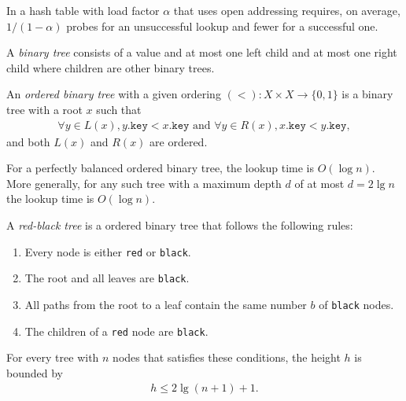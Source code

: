 \documentclass{article}
\begin{document}
\begin{proposition}
	In a hash table with load factor $\alpha$ that uses open addressing requires, on average, $1/(1-\alpha)$
	probes for an unsuccessful lookup and fewer for a successful one.
\end{proposition}
\begin{definition}
	A \emph{binary tree} consists of a value and at most one left child and at most one right child where
	children are other binary trees.
\end{definition}
\begin{definition}
	An \emph{ordered binary tree} with a given ordering $(<) : X\times X \to \{0, 1\}$ is a binary tree
	with a root $x$ such that
	\begin{align*}
		\forall y \in L(x), y.\texttt{key} < x.\texttt{key}
		\text{ and } \forall y \in R(x), x.\texttt{key} < y.\texttt{key},
	\end{align*}
	and both $L(x)$ and $R(x)$ are ordered.
\end{definition}

\begin{proposition}
	For a perfectly balanced ordered binary tree, the lookup time is $O(\log n)$.\\
	More generally, for any such tree with a maximum depth $d$ of at most $d=2 \lg n$ the
	lookup time is $O(\log n)$.
\end{proposition}

\begin{theorem}[L9]
	A \emph{red-black tree} is a ordered binary tree that follows the
	following rules:
	\begin{enumerate}
		\item Every node is either \texttt{red} or \texttt{black}.
		\item The root and all leaves are \texttt{black}.
		\item All paths from the root to a leaf contain the same number $b$ of \texttt{black} nodes.
		\item The children of a \texttt{red} node are \texttt{black}.
	\end{enumerate}
	For every tree with $n$ nodes that satisfies these conditions,
	the height $h$ is bounded by
	\begin{align*}
		h\leq 2\lg(n+1)+1.
	\end{align*}
\end{theorem}
\end{document}
